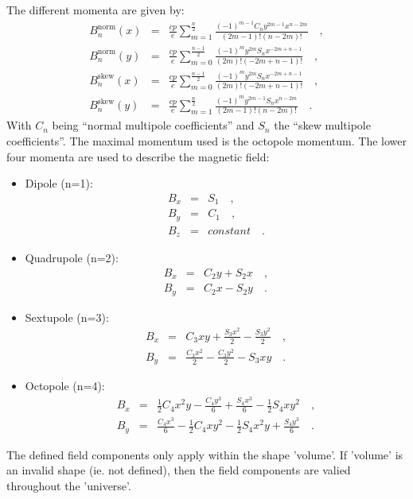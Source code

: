 The different momenta are given by:  
\begin{eqnarray*}
B_n^{\mathrm{norm}}(x)&=& \frac{cp}{e} \sum_{m=1}^{\frac{n}{2}} \frac{(-1)^{m-1} C_n y^{2 m-1} x^{n-2 m}}{(2 m-1)! (n-2 m)!} \quad, \\
B_n^{\mathrm{norm}}(y)&=& \frac{cp}{e} \sum_{m=0}^{\frac{n-1}{2}} \frac{(-1)^m y^{2 m} S_n x^{-2 m+n-1}}{(2 m)! (-2 m+n-1)!} \quad, \\
B_n^{\mathrm{skew}}(x)&=& \frac{cp}{e} \sum_{m=0}^{\frac{n-1}{2}} \frac{(-1)^m y^{2 m} S_n x^{-2 m+n-1}}{(2 m)! (-2 m+n-1)!} \quad, \\
B_n^{\mathrm{skew}}(y)&=& \frac{cp}{e} \sum_{m=1}^{\frac{n}{2}} \frac{(-1)^m y^{2 m-1} S_n x^{n-2 m}}{(2 m-1)! (n-2 m)!}\quad.
\end{eqnarray*}
With $C_n$ being ``normal multipole coefficients'' and $S_n$ the ``skew multipole coefficients''. The maximal momentum used is the octopole momentum. The lower four momenta are used
to describe the magnetic field:
\begin{itemize}
\item Dipole (n=1):
    \begin{eqnarray*}
        B_x &=& S_1\quad, \\
        B_y &=& C_1\quad, \\
        B_z &=& constant\quad.
    \end{eqnarray*}
\item Quadrupole (n=2):
    \begin{eqnarray*}
        B_x &=& C_2 y+S_2 x\quad, \\
        B_y &=& C_2 x-S_2 y\quad.
    \end{eqnarray*}
\item Sextupole (n=3):
    \begin{eqnarray*}
        B_x         &=& C_3 x y+\frac{S_3 x^2}{2}-\frac{S_3 y^2}{2}\quad, \\
        B_y         &=& \frac{C_3 x^2}{2}-\frac{C_3 y^2}{2}-S_3 x y\quad.
    \end{eqnarray*}

\item Octopole (n=4):
    \begin{eqnarray*}
        B_x &=& \frac{1}{2} C_4 x^2 y-\frac{C_4 y^3}{6}+\frac{S_4 x^3}{6}-\frac{1}{2} S_4 x y^2\quad,\\
        B_y &=& \frac{C_4 x^3}{6}-\frac{1}{2} C_4 x y^2-\frac{1}{2} S_4 x^2 y+\frac{S_4 y^3}{6}\quad.
    \end{eqnarray*}
\end{itemize}
The defined field components only apply within the shape 'volume'. If 'volume' is an invalid shape (ie. not defined), then the field components are valied throughout the 'universe'.

